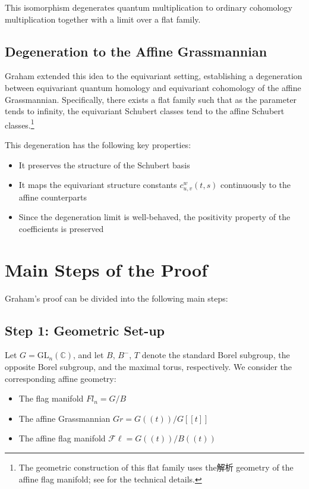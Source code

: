 This isomorphism degenerates quantum multiplication to ordinary cohomology multiplication together with a limit over a flat family.

\subsection{Degeneration to the Affine Grassmannian}

Graham extended this idea to the equivariant setting, establishing a degeneration between equivariant quantum homology and equivariant cohomology of the affine Grassmannian. Specifically, there exists a flat family such that as the parameter tends to infinity, the equivariant Schubert classes tend to the affine Schubert classes.\footnote{The geometric construction of this flat family uses the解析 geometry of the affine flag manifold; see \cite[Section 4]{Gr} for the technical details.}

This degeneration has the following key properties:
\begin{itemize}
\item It preserves the structure of the Schubert basis
\item It maps the equivariant structure constants $c_{u,v}^w(t,s)$ continuously to the affine counterparts
\item Since the degeneration limit is well-behaved, the positivity property of the coefficients is preserved
\end{itemize}

\section{Main Steps of the Proof}

Graham's proof can be divided into the following main steps:

\subsection{Step 1: Geometric Set-up}

Let $G = \mathrm{GL}_n(\mathbb{C})$, and let $B$, $B^-$, $T$ denote the standard Borel subgroup, the opposite Borel subgroup, and the maximal torus, respectively. We consider the corresponding affine geometry:
\begin{itemize}
\item The flag manifold $Fl_n = G/B$
\item The affine Grassmannian $Gr = G(\!(t)\!)/G[[t]]$
\item The affine flag manifold $\mathcal{F}\ell = G(\!(t)\!)/B(\!(t)\!)$
\end{itemize}

